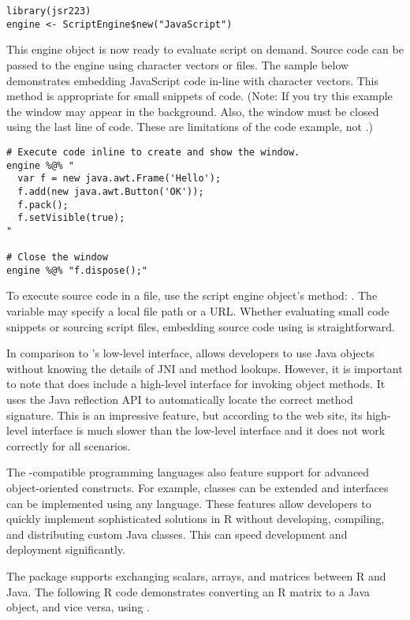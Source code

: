 \begin{verbatim}
library(jsr223)
engine <- ScriptEngine$new("JavaScript")
\end{verbatim}
This engine object is now ready to evaluate script on demand. Source code can be passed to the engine using character vectors or files. The sample below demonstrates embedding JavaScript code in-line with character vectors. This method is appropriate for small snippets of code. (Note: If you try this example the window may appear in the background. Also, the window must be closed using the last line of code. These are limitations of the code example, not .)

\begin{verbatim}
# Execute code inline to create and show the window.
engine %@% "
  var f = new java.awt.Frame('Hello');
  f.add(new java.awt.Button('OK'));
  f.pack();
  f.setVisible(true);
"

# Close the window
engine %@% "f.dispose();"
\end{verbatim}
To execute source code in a file, use the script engine object's  method:
\newline {}. The variable  may specify a local file path or a URL. Whether evaluating small code snippets or sourcing script files, embedding source code using  is straightforward.

In comparison to 's low-level interface,  allows developers to use Java objects without knowing the details of JNI and method lookups. However, it is important to note that  does include a high-level interface for invoking object methods. It uses the Java reflection API to automatically locate the correct method signature. This is an impressive feature, but according to the  web site, its high-level interface is much slower than the low-level interface and it does not work correctly for all scenarios.

The -compatible programming languages also feature support for advanced object-oriented constructs. For example, classes can be extended and interfaces can be implemented using any language. These features allow developers to quickly implement sophisticated solutions in R without developing, compiling, and distributing custom Java classes. This can speed development and deployment significantly.

The  package supports exchanging scalars, arrays, and matrices between R and Java. The following R code demonstrates converting an R matrix to a Java object, and vice versa, using .

